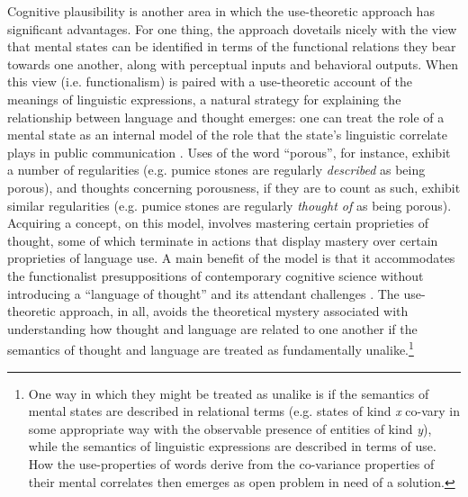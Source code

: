 Cognitive plausibility is another area in which the use-theoretic approach has significant advantages. For one thing, the approach dovetails nicely with the view that mental states can be identified in terms of the functional relations they bear towards one another, along with perceptual inputs and behavioral outputs. When this view (i.e. functionalism) is paired with a use-theoretic account of the meanings of linguistic expressions, a natural strategy for explaining the relationship between language and thought emerges: one can treat the role of a mental state as an internal model of the role that the state's linguistic correlate plays in public communication \citep{Block:1986}. Uses of the word ``porous'', for instance, exhibit a number of regularities (e.g. pumice stones are regularly \textit{described} as being porous), and thoughts concerning porousness, if they are to count as such, exhibit similar regularities (e.g. pumice stones are regularly \textit{thought of} as being porous). Acquiring a concept, on this model, involves mastering certain proprieties of thought, some of which terminate in actions that display mastery over certain proprieties of language use. A main benefit of the model is that it accommodates the functionalist presuppositions of contemporary cognitive science \citep{Fodor:1998} without introducing a ``language of thought'' and its attendant challenges \citep[see e.g.][]{Dennett:1987}. The use-theoretic approach, in all, avoids the theoretical mystery associated with understanding how thought and language are related to one another if the semantics of thought and language are treated as fundamentally unalike.\footnote{One way in which they might be treated as unalike is if the semantics of mental states are described in relational terms (e.g. states of kind \textit{x} co-vary in some appropriate way with the observable presence of entities of kind \textit{y}), while the semantics of linguistic expressions are described in terms of use. How the use-properties of words derive from the co-variance properties of their mental correlates then emerges as open problem in need of a solution.}

